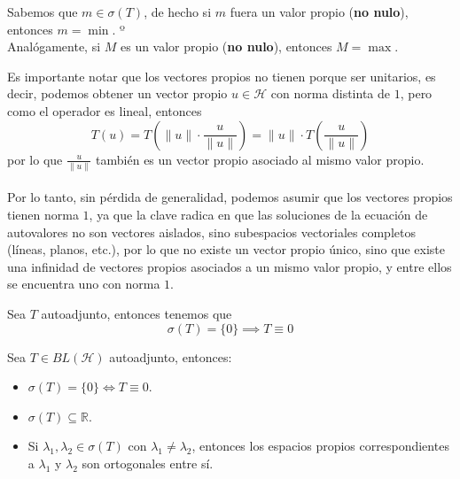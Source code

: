 \documentclass[12pt]{book}
\newcommand{\tbf}{\textbf}
\begin{document}
\begin{observacion}
    Sabemos que $m\in \sigma(T)$, de hecho si $m$ fuera un valor propio (\tbf{no nulo}), entonces \underline{$m = \min$}. º\\
    \noindent
    Analógamente, si $M$ es un valor propio (\tbf{no nulo}), entonces \underline{$M = \max$}.
\end{observacion}


\begin{observacion}
    Es importante notar que los vectores propios no tienen porque ser unitarios, es decir, podemos obtener un vector propio $u\in \mathcal{H}$ con norma distinta de $1$, pero como el operador es lineal, entonces 
    $$T(u) = T\left(\|u\| \cdot \frac{u}{\|u\|}\right) = \|u\| \cdot T\left(\frac{u}{\|u\|}\right)$$
    por lo que $\frac{u}{\|u\|}$ también es un vector propio asociado al mismo valor propio. \\ \\
    \noindent
    Por lo tanto, sin pérdida de generalidad, podemos asumir que los vectores propios tienen norma $1$, ya que la clave radica en que las soluciones de la ecuación de autovalores no son vectores aislados, sino subespacios vectoriales completos (líneas, planos, etc.), por lo que no existe un vector propio único, sino que existe una infinidad de vectores propios asociados a un mismo valor propio, y entre ellos se encuentra uno con norma $1$.\\
\end{observacion}

\begin{coro}
    Sea $T$ autoadjunto, entonces tenemos que 
    \begin{equation*}
        \sigma(T)=\{0\}\implies T \equiv 0
    \end{equation*}
\end{coro}

\begin{prop}
    Sea $T \in BL(\mathcal{H})$ autoadjunto, entonces:
    \begin{itemize}
        \item $\sigma(T) =\{0\}\iff T\equiv 0$.
        \item $\sigma(T) \subseteq \mathbb{R}$.
        \item Si $\lambda_1, \lambda_2 \in \sigma(T)$ con $\lambda_1 \neq \lambda_2$, entonces los espacios propios correspondientes a $\lambda_1$ y $\lambda_2$ son ortogonales entre sí. \\
    \end{itemize}
\end{prop}
\end{document}

